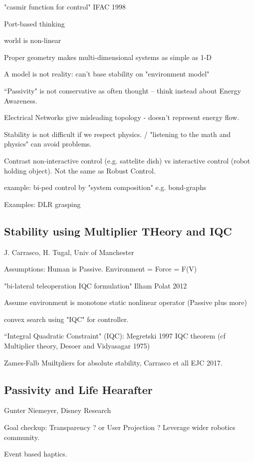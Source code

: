 \documentclass[letterpaper]{article}
\begin{document}
"casmir function for control" IFAC 1998

Port-based thinking

world is non-linear

Proper geometry makes multi-dimensional systems as simple as 1-D

A model is not reality:  can't base stability on "environment model"

``Passivity" is not conservative as often thought -- think instead about Energy Awareness.

Electrical Networks give misleading topology - doesn't represent energy flow. 

Stability is not difficult if we respect physics. / "listening to the math and physics" can avoid problems.

Contrast non-interactive control (e.g. sattelite dish) vs interactive control (robot holding object). Not the same as Robust Control.

example: bi-ped control by "system composition" e.g. bond-graphs

Examples: DLR grasping 

\subsection{Stability using Multiplier THeory and IQC}  J. Carrasco, H. Tugal, Univ of Manchester

Assumptions: Human is Passive. Environment = Force = F(V)

"bi-lateral teleoperation IQC formulation" Ilham Polat 2012

Assume environment is monotone static nonlinear operator (Passive plus more)

convex search using "IQC" for controller. 

``Integral Quadratic Constraint" (IQC):  Megretski 1997 IQC theorem  (cf Multiplier theory, Desoer and Vidyasagar 1975)

Zames-Falb Muiltpliers for absolute stability, Carrasco et all EJC 2017.

\subsection{Passivity and Life Hearafter} Gunter Niemeyer, Disney Research

Goal checkup:  Transparency ? or User Projection ?     Leverage wider robotics community.

Event based haptics.
\end{document}
